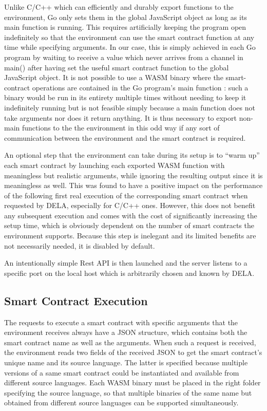 \documentclass[11pt, a4paper, twoside, openright]{article}
\begin{document}
Unlike C/C++ which can efficiently and durably export functions to the environment, Go only sets them in the global JavaScript object as long as its main function is running. This requires artificially keeping the program open indefinitely so that the environment can use the smart contract function at any time while specifying arguments. In our case, this is simply achieved in each Go program by waiting to receive a value which never arrives from a channel in main() after having set the useful smart contract function to the global JavaScript object. It is not possible to use a WASM binary where the smart-contract operations are contained in the Go program's main function : such a binary would be run in its entirety multiple times without needing to keep it indefinitely running but is not feasible simply because a main function does not take arguments nor does it return anything. It is thus necessary to export non-main functions to the the environment in this odd way if any sort of communication between the environment and the smart contract is required.

An optional step that the environment can take during its setup is to ``warm up'' each smart contract by launching each exported WASM function with meaningless but realistic arguments, while ignoring the resulting output since it is meaningless as well. This was found to have a positive impact on the performance of the following first real execution of the corresponding smart contract when requested by DELA, especially for C/C++ ones. However, this does not benefit any subsequent execution and comes with the cost of significantly increasing the setup time, which is obviously dependent on the number of smart contracts the environment supports. Because this step is inelegant and its limited benefits are not necessarily needed, it is disabled by default.

An intentionally simple Rest API is then launched and the server listens to a specific port on the local host which is arbitrarily chosen and known by DELA.
 
\subsection{Smart Contract Execution}

The requests to execute a smart contract with specific arguments that the environment receives always have a JSON structure, which contains both the smart contract name as well as the arguments. When such a request is received, the environment reads two fields of the received JSON to get the smart contract's unique name and its source language. The latter is specified because multiple versions of a same smart contract could be instantiated and available from different source languages. Each WASM binary must be placed in the right folder specifying the source language, so that multiple binaries of the same name but obtained from different source languages can be supported simultaneously. 
\end{document}
